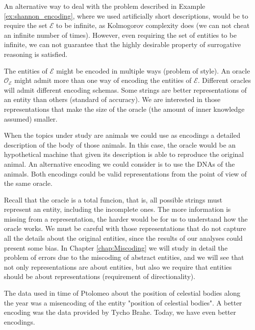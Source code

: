 An alternative way to deal with the problem described in Example \ref{ex:shannon_encoding}, where we used artificially short descriptions, would be to require the set $\mathcal{E}$ to be infinite, as Kolmogorov complexity does (we can not cheat an infinite number of times). However, even requiring the set of entities to be infinite, we can not guarantee that the highly desirable property of surrogative reasoning is satisfied.

The entities of $\mathcal{E}$ might be encoded in multiple ways (problem of style). An oracle $\mathcal{O}_\mathcal{E}$ might admit more than one way of encoding the entities of $\mathcal{E}$. Different oracles will admit different encoding schemas. Some strings are better representations of an entity than others (standard of accuracy). We are interested in those representations that make the size of the oracle (the amount of inner knowledge assumed) smaller.

\begin{example}
When the topics under study are animals we could use as encodings a detailed description of the body of those animals. In this case, the oracle would be an hypothetical machine that given its description is able to reproduce the original animal. An alternative encoding we could consider is to use the DNAs of the animals. Both encodings could be valid representations from the point of view of the same oracle.
\end{example}

Recall that the oracle is a total funcion, that is, all possible strings must represent an entity, including the incomplete ones. The more information is missing from a representation, the harder would be for us to understand how the oracle works. We must be careful with those representations that do not capture all the details about the original entities, since the results of our analyses could present some bias. In Chapter \ref{chap:Miscoding} we will study in detail the problem of errors due to the miscoding of abstract entities, and we will see that not only representations are about entities, but also we require that entities should be about representations (requirement of directionality).

\begin{example}
The data used in time of Ptolomeo about the position of celestial bodies along the year was a misencoding of the entity "position of celestial bodies". A better encoding was the data provided by Tycho Brahe. Today, we have even better encodings.
\end{example}


